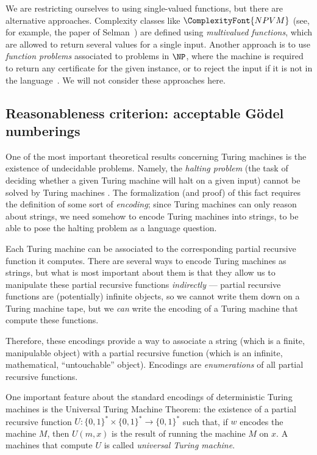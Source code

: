 \documentclass[12pt]{article}
\theoremstyle{definition}
\begin{document}
We are restricting ourselves to using single-valued functions,
but there are alternative approaches.
Complexity classes like $\ComplexityFont{NPVM}$
(see, for example, the paper of Selman~\cite[p.~359]{Selman1994})
are defined using \emph{multivalued functions},
which are allowed to return several values for a single input.
Another approach is to use \emph{function problems} associated to problems in $\NP$,
where the machine is required to return any certificate for the given instance,
or to reject the input if it is not in the language~\cite[p.~229]{Papadimitriou1994}.
We will not consider these approaches here.

\subsection{Reasonableness criterion: acceptable Gödel numberings}
\label{sec:godel-numberings}

One of the most important theoretical results concerning Turing machines
is the existence of undecidable problems.
Namely, the \emph{halting problem}
(the task of deciding whether a given Turing machine will halt on a given input)
cannot be solved by Turing machines \cite[p.~23]{AroraBarak2009}.
The formalization (and proof) of this fact
requires the definition of some sort of \emph{encoding};
since Turing machines can only reason about strings,
we need somehow to encode Turing machines into strings,
to be able to pose the halting problem as a language question.

Each Turing machine can be associated
to the corresponding partial recursive function it computes.
There are several ways to encode Turing machines as strings,
but what is most important about them is that they allow us
to manipulate these partial recursive functions \emph{indirectly}
--- partial recursive functions are (potentially) infinite objects,
so we cannot write them down on a Turing machine tape,
but we \emph{can} write the encoding of a Turing machine that compute these functions.

Therefore,
these encodings provide a way to associate a string
(which is a finite, manipulable object)
with a partial recursive function
(which is an infinite, mathematical, ``untouchable'' object).
Encodings are \emph{enumerations} of all partial recursive functions.

One important feature about the standard encodings of deterministic Turing machines
is the Universal Turing Machine Theorem:
the existence of a partial recursive function
$U: \{0, 1\}^* \times \{0, 1\}^* \to \{0, 1\}^*$
such that, if $w$ encodes the machine $M$,
then $U(m, x)$ is the result of running the machine $M$ on $x$.
A machines that compute $U$ is called \emph{universal Turing machine}.
\end{document}
